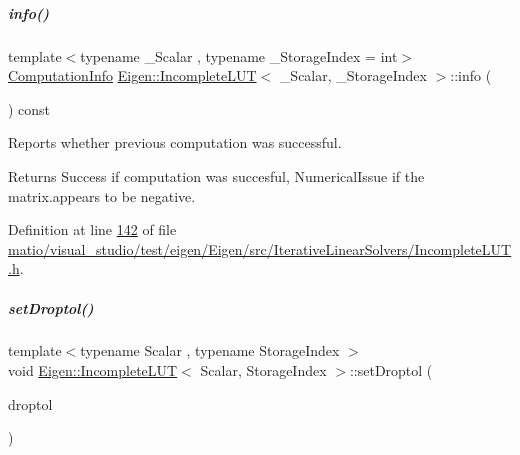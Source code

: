 \mbox{\label{group___iterative_linear_solvers___module_a941c7d34f15d7bc287e780636be0ee2b}} 
\subparagraph{\texorpdfstring{info()}{info()}\hspace{0.1cm}{\footnotesize\ttfamily [2/2]}}
{\footnotesize\ttfamily template$<$typename \+\_\+\+Scalar , typename \+\_\+\+Storage\+Index  = int$>$ \\
\hyperlink{group__enums_ga85fad7b87587764e5cf6b513a9e0ee5e}{Computation\+Info} \hyperlink{group___iterative_linear_solvers___module_class_eigen_1_1_incomplete_l_u_t}{Eigen\+::\+Incomplete\+L\+UT}$<$ \+\_\+\+Scalar, \+\_\+\+Storage\+Index $>$\+::info (\begin{DoxyParamCaption}{ }\end{DoxyParamCaption}) const\hspace{0.3cm}{\ttfamily [inline]}}



Reports whether previous computation was successful. 

\begin{DoxyReturn}{Returns}
{\ttfamily Success} if computation was succesful, {\ttfamily Numerical\+Issue} if the matrix.\+appears to be negative. 
\end{DoxyReturn}


Definition at line \hyperlink{matio_2visual__studio_2test_2eigen_2_eigen_2src_2_iterative_linear_solvers_2_incomplete_l_u_t_8h_source_l00142}{142} of file \hyperlink{matio_2visual__studio_2test_2eigen_2_eigen_2src_2_iterative_linear_solvers_2_incomplete_l_u_t_8h_source}{matio/visual\+\_\+studio/test/eigen/\+Eigen/src/\+Iterative\+Linear\+Solvers/\+Incomplete\+L\+U\+T.\+h}.

\mbox{\label{group___iterative_linear_solvers___module_a9628c5a595e9e984c72d1f8e671a6925}} 
\subparagraph{\texorpdfstring{set\+Droptol()}{setDroptol()}}
{\footnotesize\ttfamily template$<$typename Scalar , typename Storage\+Index $>$ \\
void \hyperlink{group___iterative_linear_solvers___module_class_eigen_1_1_incomplete_l_u_t}{Eigen\+::\+Incomplete\+L\+UT}$<$ Scalar, Storage\+Index $>$\+::set\+Droptol (\begin{DoxyParamCaption}\item[{const Real\+Scalar \&}]{droptol }\end{DoxyParamCaption})}

